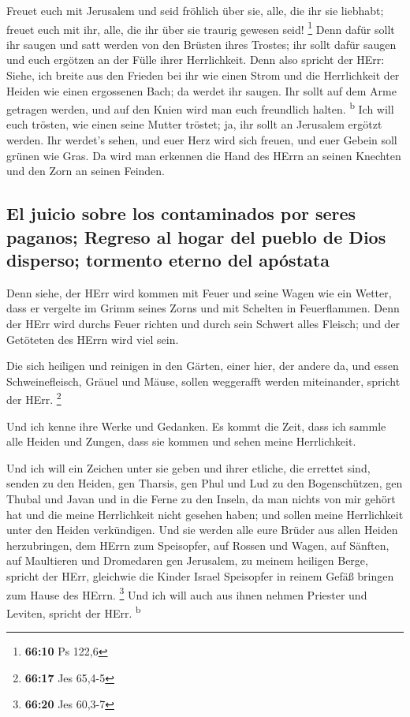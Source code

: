  Freuet euch mit Jerusalem und seid fröhlich über sie,
alle, die ihr sie liebhabt; freuet euch mit ihr, alle, die ihr über sie
traurig gewesen seid! \footnote{\textbf{66:10} Ps 122,6} 
Denn dafür sollt ihr saugen und satt werden von den Brüsten ihres
Trostes; ihr sollt dafür saugen und euch ergötzen an der Fülle ihrer
Herrlichkeit.  Denn also spricht der HErr: Siehe, ich
breite aus den Frieden bei ihr wie einen Strom und die Herrlichkeit der
Heiden wie einen ergossenen Bach; da werdet ihr saugen. Ihr sollt auf
dem Arme getragen werden, und auf den Knien wird man euch freundlich
halten. \textsuperscript{b}  Ich will euch trösten, wie
einen seine Mutter tröstet; ja, ihr sollt an Jerusalem ergötzt werden.
 Ihr werdet's sehen, und euer Herz wird sich freuen, und
euer Gebein soll grünen wie Gras. Da wird man erkennen die Hand des
HErrn an seinen Knechten und den Zorn an seinen Feinden.

\hypertarget{el-juicio-sobre-los-contaminados-por-seres-paganos-regreso-al-hogar-del-pueblo-de-dios-disperso-tormento-eterno-del-apuxf3stata}{%
\subsection{El juicio sobre los contaminados por seres paganos; Regreso
al hogar del pueblo de Dios disperso; tormento eterno del
apóstata}\label{el-juicio-sobre-los-contaminados-por-seres-paganos-regreso-al-hogar-del-pueblo-de-dios-disperso-tormento-eterno-del-apuxf3stata}}

 Denn siehe, der HErr wird kommen mit Feuer und seine
Wagen wie ein Wetter, dass er vergelte im Grimm seines Zorns und mit
Schelten in Feuerflammen.  Denn der HErr wird durchs
Feuer richten und durch sein Schwert alles Fleisch; und der Getöteten
des HErrn wird viel sein.

 Die sich heiligen und reinigen in den Gärten, einer
hier, der andere da, und essen Schweinefleisch, Gräuel und Mäuse, sollen
weggerafft werden miteinander, spricht der HErr. \footnote{\textbf{66:17}
  Jes 65,4-5}

 Und ich kenne ihre Werke und Gedanken. Es kommt die
Zeit, dass ich sammle alle Heiden und Zungen, dass sie kommen und sehen
meine Herrlichkeit.

 Und ich will ein Zeichen unter sie geben und ihrer
etliche, die errettet sind, senden zu den Heiden, gen Tharsis, gen Phul
und Lud zu den Bogenschützen, gen Thubal und Javan und in die Ferne zu
den Inseln, da man nichts von mir gehört hat und die meine Herrlichkeit
nicht gesehen haben; und sollen meine Herrlichkeit unter den Heiden
verkündigen.  Und sie werden alle eure Brüder aus allen
Heiden herzubringen, dem HErrn zum Speisopfer, auf Rossen und Wagen, auf
Sänften, auf Maultieren und Dromedaren gen Jerusalem, zu meinem heiligen
Berge, spricht der HErr, gleichwie die Kinder Israel Speisopfer in
reinem Gefäß bringen zum Hause des HErrn. \footnote{\textbf{66:20} Jes
  60,3-7}  Und ich will auch aus ihnen nehmen Priester
und Leviten, spricht der HErr. \textsuperscript{b}

